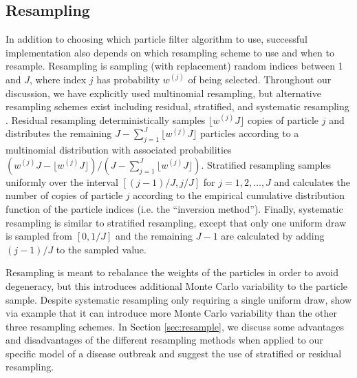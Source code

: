 \documentclass{elsarticle}
\begin{document}
\subsection{Resampling \label{sec:advice}}

In addition to choosing which particle filter algorithm to use, successful implementation also depends on which resampling scheme to use and when to resample. Resampling is sampling (with replacement) random indices between 1 and $J$, where index $j$ has probability $w^{(j)}$ of being selected. Throughout our discussion, we have explicitly used multinomial resampling, but alternative resampling schemes exist including residual, stratified, and systematic resampling \citep{Douc:Capp:Moul:comp:2005}. Residual resampling deterministically samples $\lfloor w^{(j)} J \rfloor$ copies of particle $j$ and distributes the remaining $J - \sum^J_{j=1} \lfloor w^{(j)} J \rfloor$  particles according to a multinomial distribution with associated probabilities $(w^{(j)} J - \lfloor w^{(j)} J \rfloor) / (J - \sum^J_{j=1} \lfloor w^{(j)} J \rfloor)$. Stratified resampling samples uniformly over the interval $[(j-1) / J, j / J]$ for $j = 1, 2, \ldots, J$ and calculates the number of copies of particle $j$ according to the empirical cumulative distribution function of the particle indices (i.e. the ``inversion method''). Finally, systematic resampling is similar to stratified resampling, except that only one uniform draw is sampled from $[0, 1/J]$ and the remaining $J-1$ are calculated by adding $(j-1) / J$ to the sampled value. 

Resampling is meant to rebalance the weights of the particles in order to avoid degeneracy, but this introduces additional Monte Carlo variability to the particle sample. Despite systematic resampling only requiring a single uniform draw, \citet{Douc:Capp:Moul:comp:2005} show via example that it can introduce more Monte Carlo variability than the other three resampling schemes. In Section \ref{sec:resample}, we discuss some advantages and disadvantages of the different resampling methods when applied to our specific model of a disease outbreak and suggest the use of stratified or residual resampling. %
\end{document}
